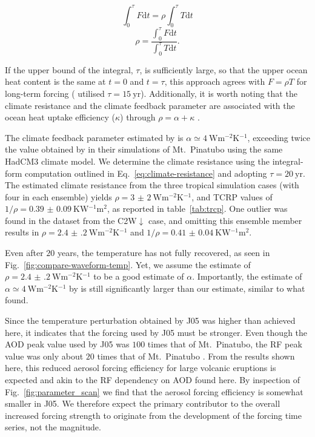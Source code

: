 \documentclass[draft]{agujournal2019}
\newcommand{\cwm}{C2W\(\downarrow\)}
\begin{document}
\begin{equation}
  \int_0^{\tau}F \mathrm{d}t=\rho\int_{0}^{\tau}T \mathrm{d}t
\end{equation}
\begin{equation}
  \rho=\frac{\int_0^{\tau}F \mathrm{d}t}{\int_{0}^{\tau}T \mathrm{d}t}.
  \label{eq:climate-resistance}
\end{equation}

If the upper bound of the integral, \(\tau \), is sufficiently large, so that the upper
ocean heat content is the same at \(t=0\) and \(t=\tau \), this approach agrees with
\(F=\rho T\) for long-term forcing \cite{gregory2016} ( utilised
\(\tau =\SI{15}{\mathrm{yr}}\)). Additionally, it is worth noting that the climate
resistance and the climate feedback parameter are associated with the ocean heat uptake
efficiency (\(\kappa \)) through \(\rho =\alpha +\kappa \) \cite{gregory2016}.

The climate feedback parameter estimated by  is \(\alpha \simeq
\SI{4}{\watt\metre^{-2}\kelvin^{-1}}\), exceeding twice the value obtained by
 in their simulations of Mt.\ Pinatubo using the same HadCM3 climate
model. We determine the climate resistance using the integral-form computation outlined
in Eq.~\ref{eq:climate-resistance} and adopting \(\tau =\SI{20}{\mathrm{yr}}\). The
estimated climate resistance from the three tropical simulation cases (with four in each
ensemble) yields \(\rho =\SI{3(2)}{\watt\metre^{-2}\kelvin^{-1}}\), and TCRP values of
\(1/\rho=\SI{0.39(9)}{\kelvin\watt^{-1}\metre^{2}}\), as reported in
table~\ref{tab:trcp}. One outlier was found in the dataset from the \cwm{} case, and
omitting this ensemble member results in \(\rho
=\SI{2.4(2)}{\watt\metre^{-2}\kelvin^{-1}}\) and \(1/\rho
=\SI{0.41(4)}{\kelvin\watt^{-1}\metre^{2}}\).

Even after \(20\) years, the temperature has not fully recovered, as seen in
Fig.~\ref{fig:compare-waveform-temp}. Yet, we assume the estimate of \(\rho
=\SI{2.4(2)}{\watt\metre^{-2}\kelvin^{-1}}\) to be a good estimate of \(\alpha \).
Importantly, the estimate of \(\alpha \simeq \SI{4}{\watt\metre^{-2}\kelvin^{-1}}\) by
 is still significantly larger than our estimate, similar to what
 found.

Since the temperature perturbation obtained by J05 was higher than achieved here, it
indicates that the forcing used by J05 must be stronger. Even though the AOD peak value
used by J05 was \(100\) times that of Mt.\ Pinatubo, the RF peak value was only about
\(20\) times that of Mt.\ Pinatubo \cite{gregory2016}. From the results shown here, this
reduced aerosol forcing efficiency for large volcanic eruptions is expected and akin to
the RF dependency on AOD found here. By inspection of Fig.~\ref{fig:parameter_scan} we
find that the aerosol forcing efficiency is somewhat smaller in J05. We therefore expect
the primary contributor to the overall increased forcing strength to originate from the
development of the forcing time series, not the magnitude.
\end{document}
